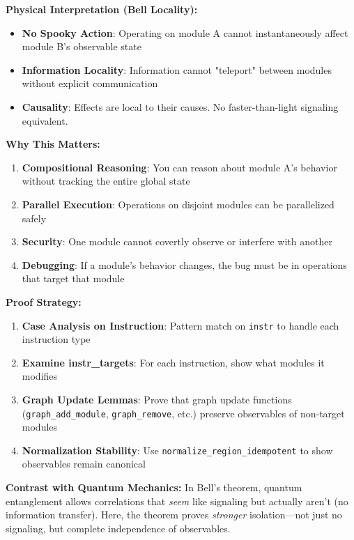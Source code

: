 \textbf{Physical Interpretation (Bell Locality):}
\begin{itemize}
    \item \textbf{No Spooky Action}: Operating on module A cannot instantaneously affect module B's observable state
    \item \textbf{Information Locality}: Information cannot "teleport" between modules without explicit communication
    \item \textbf{Causality}: Effects are local to their causes. No faster-than-light signaling equivalent.
\end{itemize}

\textbf{Why This Matters:}
\begin{enumerate}
    \item \textbf{Compositional Reasoning}: You can reason about module A's behavior without tracking the entire global state
    \item \textbf{Parallel Execution}: Operations on disjoint modules can be parallelized safely
    \item \textbf{Security}: One module cannot covertly observe or interfere with another
    \item \textbf{Debugging}: If a module's behavior changes, the bug must be in operations that target that module
\end{enumerate}

\textbf{Proof Strategy:}
\begin{enumerate}
    \item \textbf{Case Analysis on Instruction}: Pattern match on \texttt{instr} to handle each instruction type
    \item \textbf{Examine instr\_targets}: For each instruction, show what modules it modifies
    \item \textbf{Graph Update Lemmas}: Prove that graph update functions (\texttt{graph\_add\_module}, \texttt{graph\_remove}, etc.) preserve observables of non-target modules
    \item \textbf{Normalization Stability}: Use \texttt{normalize\_region\_idempotent} to show observables remain canonical
\end{enumerate}

\textbf{Contrast with Quantum Mechanics:} In Bell's theorem, quantum entanglement allows correlations that \emph{seem} like signaling but actually aren't (no information transfer). Here, the theorem proves \emph{stronger} isolation---not just no signaling, but complete independence of observables.

